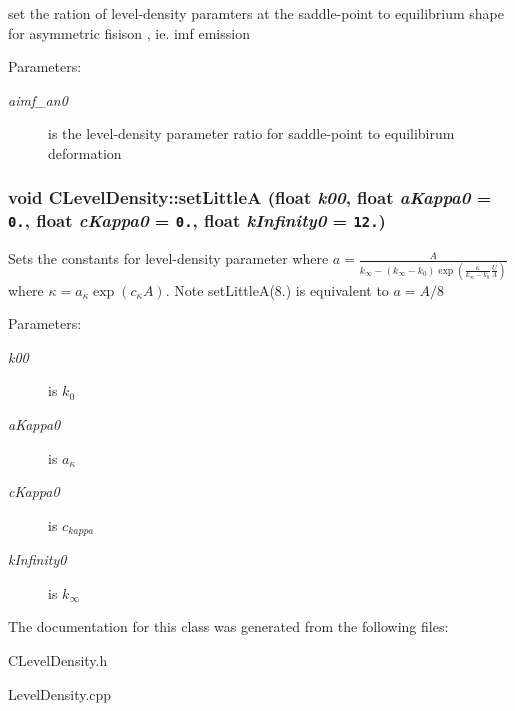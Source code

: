 set the ration of level-density paramters at the saddle-point to equilibrium shape for asymmetric fisison , ie. imf emission \begin{Desc}
\item[Parameters:]
\begin{description}
\item[{\em aimf\_\-an0}]is the level-density parameter ratio for saddle-point to equilibirum deformation \end{description}
\end{Desc}
\subsubsection{\setlength{\rightskip}{0pt plus 5cm}void CLevel\-Density::set\-Little\-A (float {\em k00}, float {\em a\-Kappa0} = {\tt 0.}, float {\em c\-Kappa0} = {\tt 0.}, float {\em k\-Infinity0} = {\tt 12.})\hspace{0.3cm}{\tt  [static]}}\label{classCLevelDensity_f92ce917d4fc2c1c57bed9cf904c1da4}


Sets the constants for level-density parameter where $a=\frac{A}{k_{\infty} - \left(k_{\infty} -k_{0} \right) \exp\left( \frac{\kappa}{k_{\infty}-k_{0}}\frac{U}{A}\right)}$ where $ \kappa = a_{\kappa} \exp\left(c_{\kappa} A\right) $. Note set\-Little\-A(8.) is equivalent to $a=A/8$ \begin{Desc}
\item[Parameters:]
\begin{description}
\item[{\em k00}]is $k_{0}$ \item[{\em a\-Kappa0}]is $a_{\kappa}$ \item[{\em c\-Kappa0}]is $c_{kappa}$ \item[{\em k\-Infinity0}]is $k_{\infty}$ \end{description}
\end{Desc}


The documentation for this class was generated from the following files:\begin{CompactItemize}
\item 
CLevel\-Density.h\item 
Level\-Density.cpp\end{CompactItemize}
